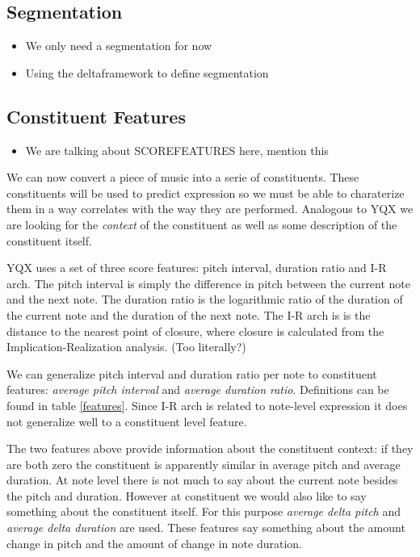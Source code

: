 \documentclass[a4paper,10pt]{article}
\begin{document}
\subsection{Segmentation}
\label{segmentation}



\begin{itemize}
\item We only need a segmentation for now
\item Using the deltaframework to define segmentation
\end{itemize}

\subsection{Constituent Features}
\label{scorefeatures}

\begin{itemize}
\item We are talking about SCOREFEATURES here, mention this
\end{itemize}

We can now convert a piece of music into a serie of constituents. These constituents will be used to predict expression so we must be able to charaterize them in a way correlates with the way they are performed. Analogous to YQX we are looking for the \textit{context} of the constituent as well as some description of the constituent itself.

YQX uses a set of three score features: pitch interval, duration ratio and I-R arch. The pitch interval is simply the difference in pitch between the current note and the next note. The duration ratio is the logarithmic ratio of the duration of the current note and the duration of the next note.  The I-R arch is is the distance to the nearest point of closure, where closure is calculated from the Implication-Realization analysis. (Too literally?)

We can generalize pitch interval and duration ratio per note to constituent features: \textit{average pitch interval} and \textit{average duration ratio}. Definitions can be found in table \ref{features}. Since I-R arch is related to note-level expression it does not generalize well to a constituent level feature. 

The two features above provide information about the constituent context: if they are both zero the constituent is apparently similar in average pitch and average duration. At note level there is not much to say about the current note besides the pitch and duration. However at constituent we would also like to say something about the constituent itself. For this purpose \textit{average delta pitch} and \textit{average delta duration} are used. These features say something about the amount change in pitch and the amount of change in note duration.
\end{document}

